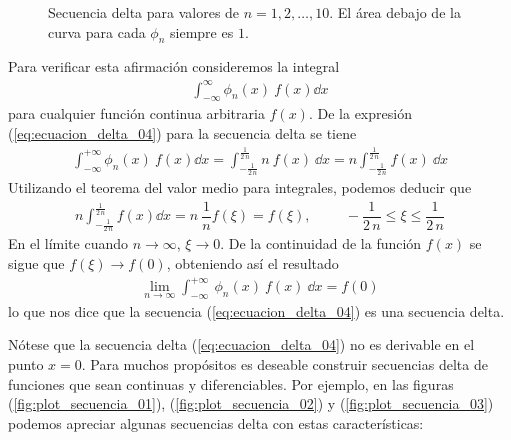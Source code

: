 \documentclass[12pt]{beamer}
\begin{document}
\begin{figure}[H]
\centering

\caption{Secuencia delta para valores de $n=1,2,\ldots,10$. El área debajo de la curva para cada $\phi_{n}$ siempre es $1$.}
\label{fig:secuncia_delta_01}
\end{figure}
Para verificar esta afirmación consideremos la integral
\begin{align*}
\int_{-\infty}^{\infty} \phi_{n} (x) \: f(x) \dd{x}
\end{align*}
para cualquier función continua arbitraria $f(x)$. De la expresión (\ref{eq:ecuacion_delta_04}) para la secuencia delta se tiene
\begin{align*}
\int_{-\infty}^{+ \infty} \phi_{n} (x) \: f(x) \dd{x} = \int_{-\frac{1}{2 \, n}}^{\frac{1}{2 \, n}} n \: f(x) \: \dd{x} = n \int_{-\frac{1}{2 \, n}}^{\frac{1}{2 \, n}} f(x) \:  \dd{x}
\end{align*}
Utilizando el teorema del valor medio para integrales, podemos deducir que
\begin{align*}
n \int_{-\frac{1}{2 \, n}}^{\frac{1}{2 \, n}} f(x) \dd{x} = n \: \dfrac{1}{n} f(\xi) = f(\xi), \hspace{1cm} - \dfrac{1}{2 \, n} \leq \xi \leq \dfrac{1}{2 \, n}
\end{align*}
En el límite cuando $n \to \infty$, $\xi \to 0$. De la continuidad de la función $f(x)$ se sigue que $f(\xi) \to f(0)$, obteniendo así el resultado
\begin{align*}
\lim_{n \to \infty} \int_{-\infty}^{+ \infty} \: \phi_{n}(x) \: f(x) \: \dd{x} = f(0)
\end{align*}
lo que nos dice que la secuencia (\ref{eq:ecuacion_delta_04}) es una secuencia delta.
\par
Nótese que la secuencia delta (\ref{eq:ecuacion_delta_04}) no es derivable en el punto $x = 0$. Para muchos propósitos es deseable
construir secuencias delta de funciones que sean continuas y diferenciables. Por ejemplo, en las figuras (\ref{fig:plot_secuencia_01}), (\ref{fig:plot_secuencia_02}) y (\ref{fig:plot_secuencia_03}) podemos apreciar algunas secuencias delta con estas características:
\end{document}
